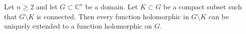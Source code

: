Let $n \geqslant 2$ and let $G \subset \mathbb{C}^n$ be a domain. Let $K \subset G$ be a compact subset such that $G \setminus K$ is connected. Then every function holomorphic in $G \setminus K$ can be uniquely extended to a function holomorphic on $G$.
